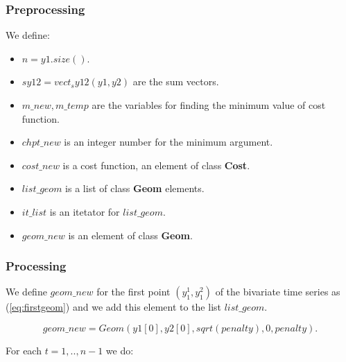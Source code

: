 \documentclass{report}
\begin{document}
\subsubsection*{Preprocessing}

We define:

\begin{itemize}
	\item $n = y1.size()$.
	
	\item $sy12 = vect_sy12(y1, y2)$ are the sum vectors.
	
	\item $m\_new, m\_temp$ are the variables for finding the minimum value of cost function.
	
	\item $chpt\_new$ is an integer number for the minimum argument.

	\item $cost\_new$ is a cost function, an element of class {\bfseries Cost}.

	\item $list\_geom$ is a list of class {\bfseries Geom} elements. 

	\item $it\_list$ is an itetator for $list\_geom$. 

	\item $geom\_new$ is an element of class {\bfseries Geom}.
\end{itemize}

\subsubsection*{Processing}

 We define $geom\_new$ for the first point $(y^1_1, y^2_1)$ of the bivariate time series as (\ref{eq:firstgeom})  and we add this element to the list $list\_geom$.
 
 \begin{equation}
 	geom\_new = Geom(y1[0], y2[0], sqrt(penalty), 0, penalty).
 	\label{eq:firstgeom}
 \end{equation}
 
 For each $t = 1,..,n-1$ we do:
 
\end{document}
